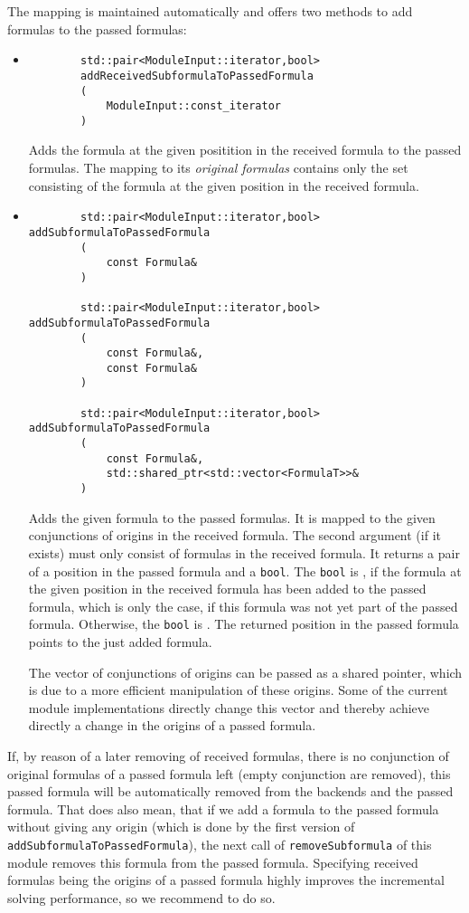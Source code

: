 The mapping is maintained automatically and offers two methods to add formulas to the passed formulas:
\begin{itemize}
	\item \begin{verbatim}
		std::pair<ModuleInput::iterator,bool> 
		addReceivedSubformulaToPassedFormula
		(
		    ModuleInput::const_iterator
		)
		\end{verbatim}
		Adds the formula at the given positition in the received formula
		to the passed formulas. The mapping to its \emph{original formulas} contains
		only the set consisting of the formula at the given position in the received formula.
	\item
		\begin{verbatim}
		std::pair<ModuleInput::iterator,bool> addSubformulaToPassedFormula
		(
		    const Formula&
		)
		
		std::pair<ModuleInput::iterator,bool> addSubformulaToPassedFormula
		(
		    const Formula&,
		    const Formula&
		)
		
		std::pair<ModuleInput::iterator,bool> addSubformulaToPassedFormula
		(
		    const Formula&,
		    std::shared_ptr<std::vector<FormulaT>>&
		)
		\end{verbatim}
		Adds the given formula to the passed formulas. It is mapped to the given conjunctions of origins in the received formula. 
		The second argument (if it exists) must only consist of formulas in the received formula.
It returns a pair of a position in the passed formula and a \texttt{bool}. The \texttt{bool} is \true, if the formula at the given position in the received formula has been added to the passed formula, which is only the case, if this formula was not yet part of the 
passed formula. Otherwise, the \texttt{bool} 
is \false. The returned position in the passed formula points to the just added formula.

The vector of conjunctions of origins can be passed as a shared pointer, which is due to a more efficient manipulation of these origins. Some of the current module implementations directly change this vector and thereby achieve directly a change in the origins of a passed formula.
	\end{itemize}
If, by reason of a later removing of received formulas, there is no conjunction of original formulas of a passed formula left (empty conjunction are removed), this passed formula will be automatically removed from the backends and the passed formula. That does also mean, that if we add
a formula to the passed formula without giving any origin (which is done by the first version of \texttt{addSubformulaToPassedFormula}), the next call of \texttt{removeSubformula} of this module removes this formula from the passed formula. Specifying received formulas being the origins of a passed formula highly improves the incremental solving performance, so we recommend to do so. 

